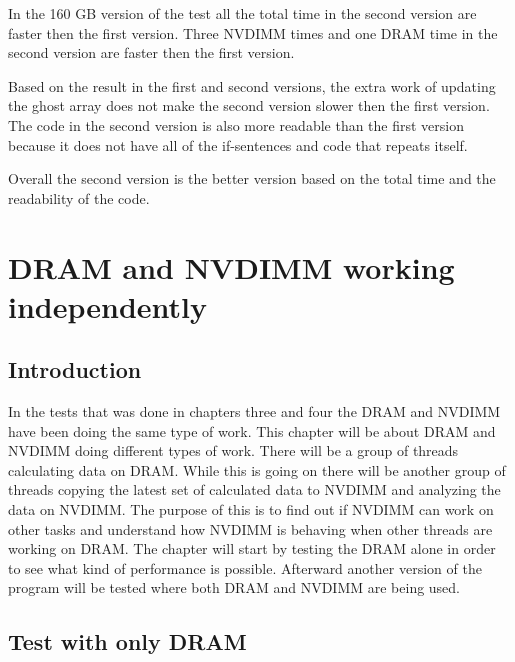 \documentclass[12pt,a4paper,USenglish]{article}      %
\begin{document}
In the 160 GB version of the test all the total time in the second version are faster then the first version. Three NVDIMM times and one DRAM time in the second version are faster then the first version.


Based on the result in the first and second versions, the extra work of updating the ghost array does not make the second version slower then the first version. The code in the second version is also more readable than the first version because it does not have all of the if-sentences and code that repeats itself. 

Overall the second version is the better version based on the total time and the readability of the code. 


\clearpage
\section{DRAM and NVDIMM working independently}
\label{Chapter:workingIndepandently}
\subsection{Introduction}
In the tests that was done in chapters three and four the DRAM and NVDIMM have been doing the same type of work. This chapter will be about DRAM and NVDIMM doing different types of work. 
There will be a group of threads calculating data on DRAM. While this is going on there will be another group of threads copying the latest set of calculated data to NVDIMM and analyzing the data on NVDIMM.
The purpose of this is to find out if NVDIMM can work on other tasks and understand how NVDIMM is behaving when other threads are working on DRAM.
The chapter will start by testing the DRAM alone in order to see what kind of performance is possible. Afterward another version of the program will be tested where both DRAM and NVDIMM are being used. 

\subsection{Test with only DRAM}
\label{section:DramOnly}
\end{document}
